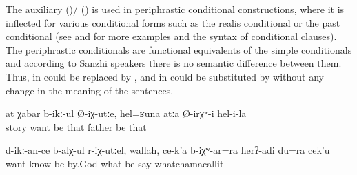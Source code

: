 The auxiliary  ()\slash{} ()  is used in periphrastic conditional constructions, where it is inflected for various conditional forms such as the realis conditional  or the past conditional  (see  and  for more examples and  the syntax of conditional clauses). The periphrastic conditionals are functional equivalents of the simple conditionals and according to Sanzhi speakers there is no semantic difference between them. Thus, in   could be replaced by , and in   could be substituted by  without any change in the meaning of the sentences.
%
\begin{exe}
	\ex	\label{ex:‎If you want stories, (here is one), she had such a father (and these were the stories about him)}
	\gll	at	χabar	b-ikː-ul	Ø-iχ-utːe,	hel=ʁuna	atːa	Ø-irχʷ-i	hel-i-la\\
			story	want	be	that	father	be	that\\
	\glt	{}

	\ex	\label{ex:‎If I would have known what you want, by God, I would also have said something}
	\gll	d-ikː-an-ce	b-alχ-ul	r-iχ-utːel,	wallah,	ce-k'a	b-iχʷ-ar=ra	herʔ-adi		du=ra	cek'u\\
		want	know	be	by.God	what	be	say		whatchamacallit\\
	\glt	{}
\end{exe}




